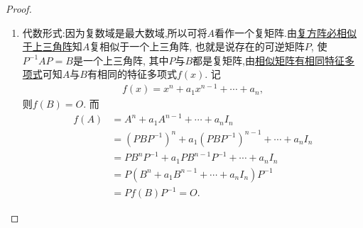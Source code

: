 \documentclass[../../main.tex]{subfiles}
\begin{document}
\begin{proof}
\begin{enumerate}
\item {\heiti 代数形式:}因为复数域是最大数域,所以可将$A$看作一个复矩阵.由\hyperref[theorem:复方阵必相似于上三角阵]{复方阵必相似于上三角阵}知$A$复相似于一个上三角阵, 也就是说存在的可逆矩阵$P$, 使$P^{-1}AP = B$是一个上三角阵, 其中$P$与$B$都是复矩阵,由\hyperref[theorem:相似矩阵有相同的特征多项式与特征值]{相似矩阵有相同特征多项式}可知$A$与$B$有相同的特征多项式$f(x)$. 记
\begin{align*}
f(x) = x^n + a_1 x^{n-1} + \cdots + a_n,
\end{align*}
则$f(B) = O$. 而
\begin{align*}
f(A) &= A^n + a_1 A^{n-1} + \cdots + a_n I_n \\
&= (PBP^{-1})^n + a_1 (PBP^{-1})^{n-1} + \cdots + a_n I_n \\
&= PB^n P^{-1} + a_1 PB^{n-1} P^{-1} + \cdots + a_n I_n \\
&= P(B^n + a_1 B^{n-1} + \cdots + a_n I_n)P^{-1} \\
&= P f(B) P^{-1} = O.
\end{align*}


\end{enumerate}
\end{proof}
\end{document}
